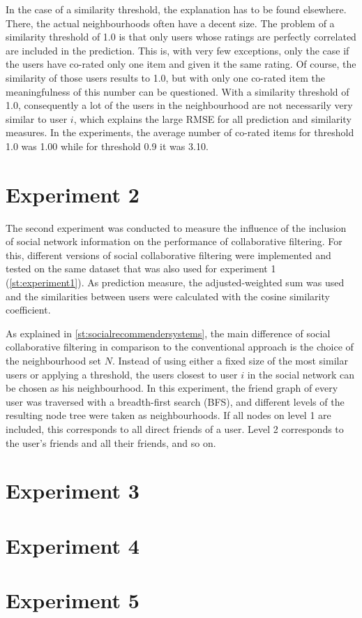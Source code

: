In the case of a similarity threshold, the explanation has to be found elsewhere. There, the actual neighbourhoods often have a decent size. The problem of a similarity threshold of 1.0 is that only users whose ratings are perfectly correlated are included in the prediction. This is, with very few exceptions, only the case if the users have co-rated only one item and given it the same rating. Of course, the similarity of those users results to 1.0, but with only one co-rated item the meaningfulness of this number can be questioned. With a similarity threshold of 1.0, consequently a lot of the users in the neighbourhood are not necessarily very similar to user $i$, which explains the large RMSE for all prediction and similarity measures. In the experiments, the average number of co-rated items for threshold 1.0 was 1.00 while for threshold 0.9 it was 3.10.

\section{Experiment 2}
\label{st:experiment2} The second experiment was conducted to measure the influence of the inclusion of social network information on the performance of collaborative filtering. For this, different versions of social collaborative filtering were implemented and tested on the same dataset that was also used for experiment 1 (\ref{st:experiment1}). As prediction measure, the adjusted-weighted sum was used and the similarities between users were calculated with the cosine similarity coefficient.

As explained in \ref{st:socialrecommendersystems}, the main difference of social collaborative filtering in comparison to the conventional approach is the choice of the neighbourhood set $N$. Instead of using either a fixed size of the most similar users or applying a threshold, the users closest to user $i$ in the social network can be chosen as his neighbourhood. In this experiment, the friend graph of every user was traversed with a breadth-first search (BFS), and different levels of the resulting node tree were taken as neighbourhoods. If all nodes on level 1 are included, this corresponds to all direct friends of a user. Level 2 corresponds to the user's friends and all their friends, and so on. 

\section{Experiment 3}
\label{st:experiment3}

\section{Experiment 4}
\label{st:experiment4}

\section{Experiment 5}
\label{st:experiment5}